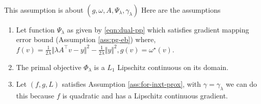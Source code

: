 \documentclass[12pt]{article}
\begin{document}
    \begin{assumption}\;\label{ass:eb-for-pp}\\
        This assumption is about $(g, \omega, A, \Psi_\lambda, \gamma_\lambda)$
        Here are the assumptions
        \begin{enumerate}[nosep]
            \item Let function $\Psi_\lambda$ as given by \eqref{eqn:dual-pp} which satisfies gradient mapping error bound (Assumption \ref{ass:pg-eb}) where, $f(v) = \frac{1}{2\lambda}\Vert \lambda A^\top v - y\Vert^2 - \frac{1}{2\lambda}\Vert y\Vert^2, g(v) = \omega^\star(v)$. 
            \item The primal objective $\Phi_\lambda$ is a $L_1$ Lipschitz continuous on its domain. 
            \item Let $(f, g, L)$ satisfies Assumption \ref{ass:for-inxt-prox}, with $\gamma = \gamma_\lambda$ we can do this because $f$ is quadratic and has a Lipschitz continuous gradient. 
        \end{enumerate}
    \end{assumption}
\end{document}
